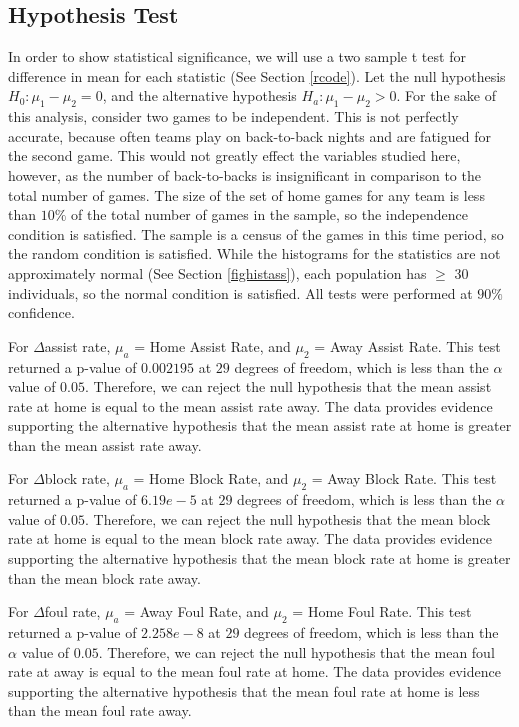 \documentclass{article}
\begin{document}
\subsection{Hypothesis Test}
In order to show statistical significance, we will use a two sample t test for difference in mean for each statistic (See Section \ref{rcode}). Let the null hypothesis $H_0: \mu_1 - \mu_2 = 0$, and the alternative hypothesis $H_a: \mu_1 - \mu_2 > 0$. For the sake of this analysis, consider two games to be independent. This is not perfectly accurate, because often teams play on back-to-back nights and are fatigued for the second game. This would not greatly effect the variables studied here, however, as the number of back-to-backs is insignificant in comparison to the total number of games. 
The size of the set of home games for any team is less than $10\%$ of the total number of games in the sample, so the independence condition is satisfied. The sample is a census of the games in this time period, so the random condition is satisfied. While the histograms for the statistics are not approximately normal (See Section \ref{fighistass}), each population has $\ge$ 30 individuals, so the normal condition is satisfied. All tests were performed at $90\%$ confidence.
\par For $\Delta$assist rate, $\mu_a$ = Home Assist Rate, and $\mu_2$ = Away Assist Rate. This test returned a p-value of $0.002195$ at $29$ degrees of freedom, which is less than the $\alpha$ value of $0.05$. Therefore, we can reject the null hypothesis that the mean assist rate at home is equal to the mean assist rate away. The data provides evidence supporting the alternative hypothesis that the mean assist rate at home is greater than the mean assist rate away.
\par For $\Delta$block rate, $\mu_a$ = Home Block Rate, and $\mu_2$ = Away Block Rate. This test returned a p-value of $6.19e-5$ at $29$ degrees of freedom, which is less than the $\alpha$ value of $0.05$. Therefore, we can reject the null hypothesis that the mean block rate at home is equal to the mean block rate away. The data provides evidence supporting the alternative hypothesis that the mean block rate at home is greater than the mean block rate away.
\par For $\Delta$foul rate, $\mu_a$ = Away Foul Rate, and $\mu_2$ = Home Foul Rate. This test returned a p-value of $2.258e-8$ at $29$ degrees of freedom, which is less than the $\alpha$ value of $0.05$. Therefore, we can reject the null hypothesis that the mean foul rate at away is equal to the mean foul rate at home. The data provides evidence supporting the alternative hypothesis that the mean foul rate at home is less than the mean foul rate away.
\end{document}
